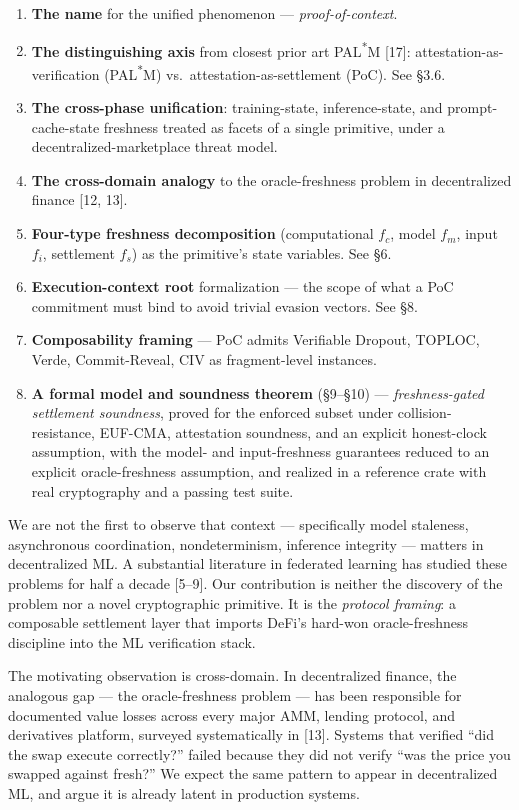 \documentclass[11pt]{article}
\begin{document}
\begin{enumerate}
\item \textbf{The name} for the unified phenomenon --- \emph{proof-of-context}.
\item \textbf{The distinguishing axis} from closest prior art PAL\textsuperscript{*}M [17]: attestation-as-verification (PAL\textsuperscript{*}M) vs.\ attestation-as-settlement (PoC). See \S3.6.
\item \textbf{The cross-phase unification}: training-state, inference-state, and prompt-cache-state freshness treated as facets of a single primitive, under a decentralized-marketplace threat model.
\item \textbf{The cross-domain analogy} to the oracle-freshness problem in decentralized finance [12, 13].
\item \textbf{Four-type freshness decomposition} (computational $f_c$, model $f_m$, input $f_i$, settlement $f_s$) as the primitive's state variables. See \S6.
\item \textbf{Execution-context root} formalization --- the scope of what a PoC commitment must bind to avoid trivial evasion vectors. See \S8.
\item \textbf{Composability framing} --- PoC admits Verifiable Dropout, TOPLOC, Verde, Commit-Reveal, CIV as fragment-level instances.
\item \textbf{A formal model and soundness theorem} (\S9--\S10) --- \emph{freshness-gated settlement soundness}, proved for the enforced subset under collision-resistance, EUF-CMA, attestation soundness, and an explicit honest-clock assumption, with the model- and input-freshness guarantees reduced to an explicit oracle-freshness assumption, and realized in a reference crate with real cryptography and a passing test suite.
\end{enumerate}

We are not the first to observe that context --- specifically model staleness, asynchronous coordination, nondeterminism, inference integrity --- matters in decentralized ML. A substantial literature in federated learning has studied these problems for half a decade [5--9]. Our contribution is neither the discovery of the problem nor a novel cryptographic primitive. It is the \emph{protocol framing}: a composable settlement layer that imports DeFi's hard-won oracle-freshness discipline into the ML verification stack.

The motivating observation is cross-domain. In decentralized finance, the analogous gap --- the oracle-freshness problem --- has been responsible for documented value losses across every major AMM, lending protocol, and derivatives platform, surveyed systematically in [13]. Systems that verified ``did the swap execute correctly?'' failed because they did not verify ``was the price you swapped against fresh?'' We expect the same pattern to appear in decentralized ML, and argue it is already latent in production systems.
\end{document}
